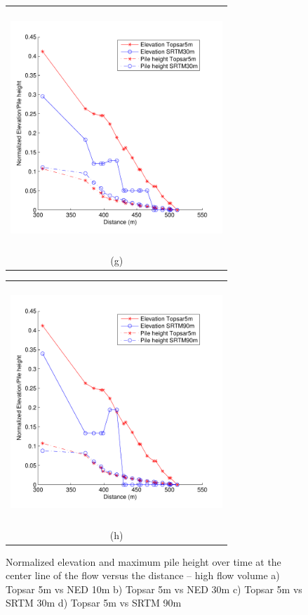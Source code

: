 \documentclass[12pt,letterpaper]{article}
\begin{document}
\begin{figure}[H]
\begin{minipage}[b]{0.5\textwidth}
    \begin{tabular}{c}
      \includegraphics[width=8cm,height=9cm,keepaspectratio]{plots/high_T5_S30.pdf}\\
      (g)
    \end{tabular}
  \end{minipage}
  \begin{minipage}{0.5\textwidth}
    \begin{tabular}{c}
      \includegraphics[width=8cm,height=9cm,keepaspectratio]{plots/high_T5_S90.pdf}\\
      (h)
    \end{tabular}
  \end{minipage}
  \caption{Normalized elevation and maximum pile height over time at the center line of the flow versus the distance -- high flow volume a) Topsar 5m vs NED 10m b) Topsar 5m vs NED 30m c) Topsar 5m vs SRTM 30m d) Topsar 5m vs SRTM 90m }\label{fig13}
\end{figure}
\end{document}
